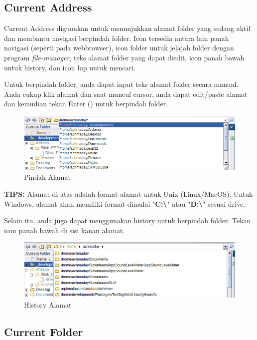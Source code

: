 \documentclass[12pt]{book}
\begin{document}
	\subsection{Current Address}
	
	Current Address digunakan untuk menunjukkan alamat folder yang sedang aktif dan membantu navigasi berpindah folder.
	Icon tersedia antara lain panah navigasi (seperti pada webbrowser), icon folder untuk jelajah folder dengan program \textit{file-manager},
	teks alamat folder yang dapat diedit, icon panah bawah untuk history, dan icon lup untuk mencari.
	
	Untuk berpindah folder, anda dapat input teks alamat folder secara manual.
	Anda cukup klik alamat dan saat muncul cursor, anda dapat edit/paste alamat dan kemudian tekan Enter (\keys{\return}) untuk berpindah folder.
	
	\begin{figure}[!ht]
		\centering
		\includegraphics[width=350pt]{images/addressbaredit}
		\caption{Pindah Alamat}
	\end{figure}

	\textbf{TIPS:} Alamat di atas adalah format alamat untuk Unix (Linux/MacOS).
	Untuk Windows, alamat akan memiliki format dimulai "\textbf{C:\textbackslash}" atau "\textbf{D:\textbackslash}" sesuai drive.
	
	Selain itu, anda juga dapat menggunakan history untuk berpindah folder.
	Tekan icon panah bawah di sisi kanan alamat.
	
	\begin{figure}[!ht]
		\centering
		\includegraphics[width=350pt]{images/addressbarhistory}
		\caption{History Alamat}
	\end{figure}
	
	\newpage
	\subsection{Current Folder}
	
\end{document}
